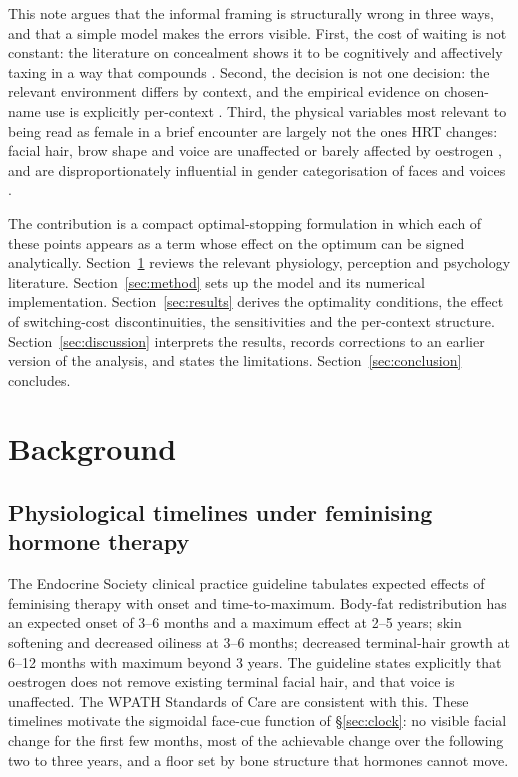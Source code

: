 \documentclass[11pt,a4paper]{article}
\theoremstyle{remark}
\begin{document}
This note argues that the informal framing is structurally wrong in three ways, and that a simple model makes the errors visible. First, the cost of waiting is not constant: the literature on concealment shows it to be cognitively and affectively taxing in a way that compounds \cite{pachankis2007,testa2015}. Second, the decision is not one decision: the relevant environment differs by context, and the empirical evidence on chosen-name use is explicitly per-context \cite{russell2018}. Third, the physical variables most relevant to being read as female in a brief encounter are largely not the ones HRT changes: facial hair, brow shape and voice are unaffected or barely affected by oestrogen \cite{hembree2017,davies2015}, and are disproportionately influential in gender categorisation of faces and voices \cite{brown1993,gelfer2005}.

The contribution is a compact optimal-stopping formulation in which each of these points appears as a term whose effect on the optimum can be signed analytically. Section~\ref{sec:background} reviews the relevant physiology, perception and psychology literature. Section~\ref{sec:method} sets up the model and its numerical implementation. Section~\ref{sec:results} derives the optimality conditions, the effect of switching-cost discontinuities, the sensitivities and the per-context structure. Section~\ref{sec:discussion} interprets the results, records corrections to an earlier version of the analysis, and states the limitations. Section~\ref{sec:conclusion} concludes.

\section{Background}
\label{sec:background}

\subsection{Physiological timelines under feminising hormone therapy}

The Endocrine Society clinical practice guideline \cite{hembree2017} tabulates expected effects of feminising therapy with onset and time-to-maximum. Body-fat redistribution has an expected onset of 3--6 months and a maximum effect at 2--5 years; skin softening and decreased oiliness at 3--6 months; decreased terminal-hair growth at 6--12 months with maximum beyond 3 years. The guideline states explicitly that oestrogen does not remove existing terminal facial hair, and that voice is unaffected. The WPATH Standards of Care \cite{coleman2022} are consistent with this. These timelines motivate the sigmoidal face-cue function of \S\ref{sec:clock}: no visible facial change for the first few months, most of the achievable change over the following two to three years, and a floor set by bone structure that hormones cannot move.
\end{document}
